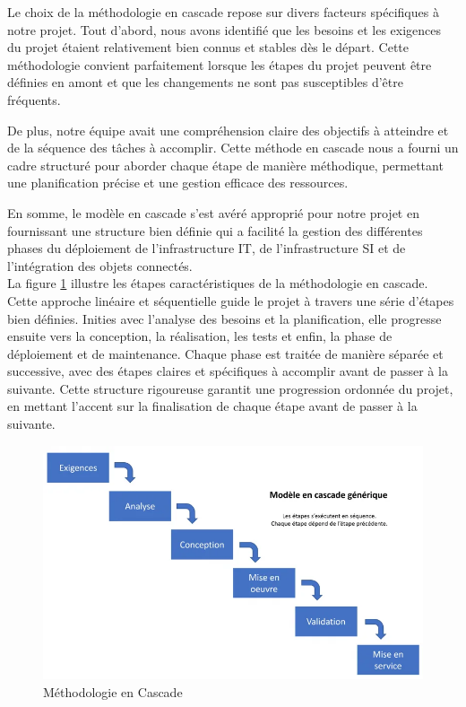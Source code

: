Le choix de la méthodologie en cascade repose sur divers facteurs spécifiques à notre projet. Tout d'abord, nous avons identifié que les besoins et les exigences du projet étaient relativement bien connus et stables dès le départ. Cette méthodologie convient parfaitement lorsque les étapes du projet peuvent être définies en amont et que les changements ne sont pas susceptibles d'être fréquents.

De plus, notre équipe avait une compréhension claire des objectifs à atteindre et de la séquence des tâches à accomplir. Cette méthode en cascade nous a fourni un cadre structuré pour aborder chaque étape de manière méthodique, permettant une planification précise et une gestion efficace des ressources. 

En somme, le modèle en cascade s'est avéré approprié pour notre projet en fournissant une structure bien définie qui a facilité la gestion des différentes phases du déploiement de l'infrastructure IT, de l'infrastructure SI et de l'intégration des objets connectés. \\


La figure \ref{Chap1.4} illustre les étapes caractéristiques de la méthodologie en cascade. Cette approche linéaire \cite{blogcascade} et séquentielle guide le projet à travers une série d'étapes bien définies. Inities avec l'analyse des besoins et la planification, elle progresse ensuite vers la conception, la réalisation, les tests et enfin, la phase de déploiement et de maintenance. Chaque phase est traitée de manière séparée et successive, avec des étapes claires et spécifiques à accomplir avant de passer à la suivante. Cette structure rigoureuse garantit une progression ordonnée du projet, en mettant l'accent sur la finalisation de chaque étape avant de passer à la suivante.


\begin{figure}[H]
 \centering
    \includegraphics[width=15cm]{Images/cascade1.png}
    \caption{Méthodologie en Cascade}
    \label{Chap1.4}
\end{figure}

